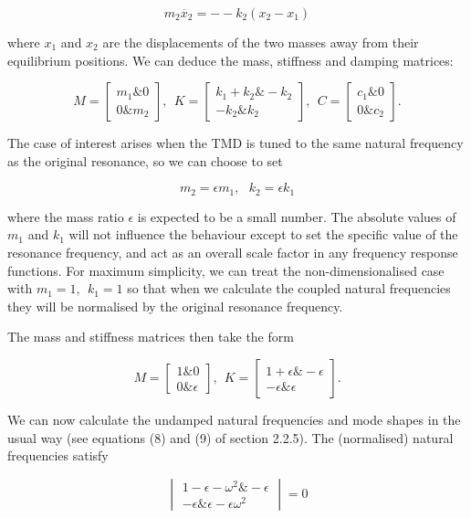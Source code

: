   $$m_2 \ddot{x_2} = -- k_2 (x_2 -x_1) \tag{2}$$ 

  where $x_1$ and $x_2$ are the displacements of the two masses away from their 
  equilibrium positions. We can deduce the mass, stiffness and damping 
  matrices: 

  $$M=\begin{bmatrix}m_1 \& 0\\ 0 \& 
  m_2\end{bmatrix},~~K=\begin{bmatrix}k_1+k_2 \& -k_2\\ -k_2 \& 
  k_2\end{bmatrix},~~C=\begin{bmatrix}c_1 \& 0\\ 0 \& c_2\end{bmatrix} . 
  \tag{3}$$ 

  The case of interest arises when the TMD is tuned to the same natural 
  frequency as the original resonance, so we can choose to set 

  $$m_2=\epsilon m_1,~~~k_2=\epsilon k_1 \tag{4}$$ 

  where the mass ratio $\epsilon$ is expected to be a small number. The 
  absolute values of $m_1$ and $k_1$ will not influence the behaviour except to 
  set the specific value of the resonance frequency, and act as an overall 
  scale factor in any frequency response functions. For maximum simplicity, we 
  can treat the non-dimensionalised case with $m_1=1,~~k_1=1$ so that when we 
  calculate the coupled natural frequencies they will be normalised by the 
  original resonance frequency. 

  The mass and stiffness matrices then take the form 

  $$M=\begin{bmatrix}1 \& 0\\ 0 \& 
  \epsilon\end{bmatrix},~~K=\begin{bmatrix}1+\epsilon \& -\epsilon\\ -\epsilon 
  \& \epsilon\end{bmatrix} . \tag{5}$$ 

  We can now calculate the undamped natural frequencies and mode shapes in the 
  usual way (see equations (8) and (9) of section 2.2.5). The (normalised) 
  natural frequencies satisfy 

  $$\begin{vmatrix}1-\epsilon-\omega^2 \& -\epsilon \\ -\epsilon \& 
  \epsilon-\epsilon \omega^2\end{vmatrix} =0 \tag{6}$$ 

